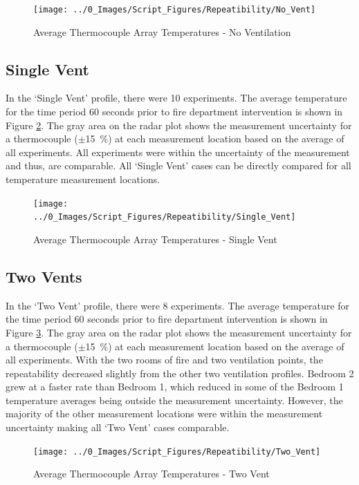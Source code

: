 \documentclass[12pt,oneside]{book}
\begin{document}
\begin{figure}[H]
\centering
\texttt{[image: ../0\_Images/Script\_Figures/Repeatibility/No\_Vent]}
\caption{Average Thermocouple Array Temperatures - No Ventilation}
\label{fig:repeat_No_Vent}
\end{figure}

\subsection{Single Vent}
In the `Single Vent' profile, there were 10 experiments. The average temperature for the time period 60 seconds prior to fire department intervention is shown in Figure \ref{fig:repeat_Single_Vent}. The gray area on the radar plot shows the measurement uncertainty for a thermocouple ($\pm$15~\%) at each measurement location based on the average of all experiments. All experiments were within the uncertainty of the measurement and thus, are comparable. All `Single Vent' cases can be directly compared for all temperature measurement locations. 

\begin{figure}[H]
\centering
\texttt{[image: ../0\_Images/Script\_Figures/Repeatibility/Single\_Vent]}
\caption{Average Thermocouple Array Temperatures - Single Vent}
\label{fig:repeat_Single_Vent}
\end{figure}

\subsection{Two Vents}
In the `Two Vent' profile, there were 8 experiments. The average temperature for the time period 60 seconds prior to fire department intervention is shown in Figure \ref{fig:repeat_Two_Vent}. The gray area on the radar plot shows the measurement uncertainty for a thermocouple ($\pm$15~\%) at each measurement location based on the average of all experiments. With the two rooms of fire and two ventilation points, the repeatability decreased slightly from the other two ventilation profiles. Bedroom 2 grew at a faster rate than Bedroom 1, which reduced in some of the Bedroom 1 temperature averages being outside the measurement uncertainty. However, the majority of the other measurement locations were within the measurement uncertainty making all `Two Vent' cases comparable. 

\begin{figure}[H]
\centering
\texttt{[image: ../0\_Images/Script\_Figures/Repeatibility/Two\_Vent]}
\caption{Average Thermocouple Array Temperatures - Two Vent}
\label{fig:repeat_Two_Vent}
\end{figure}
\end{document}
